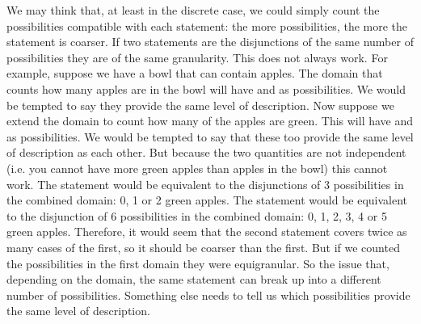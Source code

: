 \documentclass[11pt,letterpaper,fleqn]{memoir} %
\begin{document}
We may think that, at least in the discrete case, we could simply count the possibilities compatible with each statement: the more possibilities, the more the statement is coarser. If two statements are the disjunctions of the same number of possibilities they are of the same granularity. This does not always work. For example, suppose we have a bowl that can contain apples. The domain that counts how many apples are in the bowl will have  and  as possibilities. We would be tempted to say they provide the same level of description. Now suppose we extend the domain to count how many of the apples are green. This will have  and  as possibilities. We would be tempted to say that these too provide the same level of description as each other. But because the two quantities are not independent (i.e. you cannot have more green apples than apples in the bowl) this cannot work. The statement  would be equivalent to the disjunctions of 3 possibilities in the combined domain: 0, 1 or 2 green apples. The statement  would be equivalent to the disjunction of 6 possibilities in the combined domain: 0, 1, 2, 3, 4 or 5 green apples. Therefore, it would seem that the second statement covers twice as many cases of the first, so it should be coarser than the first. But if we counted the possibilities in the first domain they were equigranular. So the issue that, depending on the domain, the same statement can break up into a different number of possibilities. Something else needs to tell us which possibilities provide the same level of description.

\end{document}
